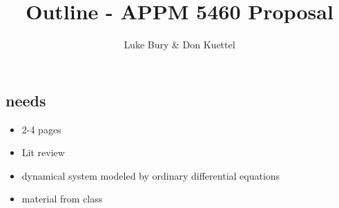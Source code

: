 \documentclass{article}
\title{Outline - APPM 5460 Proposal}
\author{Luke Bury \& Don Kuettel}
\begin{document}
\maketitle


\subsection{needs}
\begin{itemize}
  \item 2-4 pages
  \item Lit review
  \item dynamical system modeled by ordinary differential equations
  \item material from class\\\\\\
\end{itemize}
\end{document}
